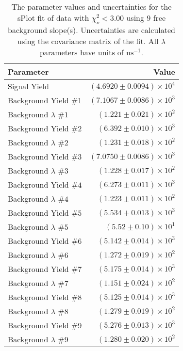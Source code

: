 
\begin{table}
    \begin{center}
        \begin{tabular}{lr}\toprule
            Parameter & Value \\\midrule
            Signal Yield & $(4.6920 \pm 0.0094) \times 10^{4}$ \\
            Background Yield $\#1$ & $(7.1067 \pm 0.0086) \times 10^{3}$ \\
            Background $\lambda$ $\#1$ & $(1.221 \pm 0.021) \times 10^{2}$ \\
            Background Yield $\#2$ & $(6.392 \pm 0.010) \times 10^{3}$ \\
            Background $\lambda$ $\#2$ & $(1.231 \pm 0.018) \times 10^{2}$ \\
            Background Yield $\#3$ & $(7.0750 \pm 0.0086) \times 10^{3}$ \\
            Background $\lambda$ $\#3$ & $(1.228 \pm 0.017) \times 10^{2}$ \\
            Background Yield $\#4$ & $(6.273 \pm 0.011) \times 10^{3}$ \\
            Background $\lambda$ $\#4$ & $(1.223 \pm 0.011) \times 10^{2}$ \\
            Background Yield $\#5$ & $(5.534 \pm 0.013) \times 10^{3}$ \\
            Background $\lambda$ $\#5$ & $(5.52 \pm 0.10) \times 10^{1}$ \\
            Background Yield $\#6$ & $(5.142 \pm 0.014) \times 10^{3}$ \\
            Background $\lambda$ $\#6$ & $(1.272 \pm 0.019) \times 10^{2}$ \\
            Background Yield $\#7$ & $(5.175 \pm 0.014) \times 10^{3}$ \\
            Background $\lambda$ $\#7$ & $(1.151 \pm 0.024) \times 10^{2}$ \\
            Background Yield $\#8$ & $(5.125 \pm 0.014) \times 10^{3}$ \\
            Background $\lambda$ $\#8$ & $(1.279 \pm 0.019) \times 10^{2}$ \\
            Background Yield $\#9$ & $(5.276 \pm 0.013) \times 10^{3}$ \\
            Background $\lambda$ $\#9$ & $(1.280 \pm 0.020) \times 10^{2}$ \\\bottomrule
        \end{tabular}
        \caption{The parameter values and uncertainties for the sPlot fit of data with $\chi^2_\nu < 3.00$ using 9 free background slope(s). Uncertainties are calculated using the covariance matrix of the fit. All $\lambda$ parameters have units of $\si{\nano\second}^{-1}$.}
    \end{center}
\end{table}

